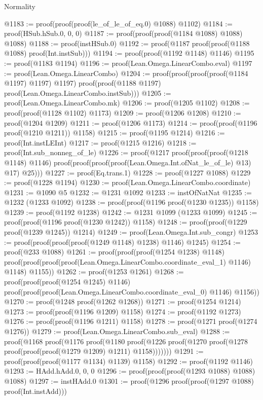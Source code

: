 \begin{lexlean}{Normality}
\begin{coremodule}
@1183 := proof(proof(proof(le_of_le_of_eq.{0}) @1088) @1102)
@1184 := proof(HSub.hSub.{0, 0, 0})
@1187 := proof(proof(proof(@1184 @1088) @1088) @1088)
@1188 := proof(instHSub.{0})
@1192 := proof(@1187 proof(proof(@1188 @1088) proof(Int.instSub)))
@1194 := proof(proof(@1192 @1148) @1146)
@1195 := proof(@1183 @1194)
@1196 := proof(Lean.Omega.LinearCombo.eval)
@1197 := proof(Lean.Omega.LinearCombo)
@1204 := proof(proof(proof(proof(@1184 @1197) @1197) @1197)
      proof(proof(@1188 @1197) proof(Lean.Omega.LinearCombo.instSub)))
@1205 := proof(Lean.Omega.LinearCombo.mk)
@1206 := proof(@1205 @1102)
@1208 := proof(proof(@1128 @1102) @1173)
@1209 := proof(@1206 @1208)
@1210 := proof(@1204 @1209)
@1211 := proof(@1206 @1173)
@1214 := proof(proof(@1196 proof(@1210 @1211)) @1158)
@1215 := proof(@1195 @1214)
@1216 := proof(Int.instLEInt)
@1217 := proof(@1215 @1216)
@1218 := proof(Int.sub_nonneg_of_le)
@1226 := proof(@1217
      proof(proof(proof(@1218 @1148) @1146)
          proof(proof(proof(proof(Lean.Omega.Int.ofNat_le_of_le) @13) @17) @25)))
@1227 := proof(Eq.trans.{1})
@1228 := proof(@1227 @1088)
@1229 := proof(@1228 @1194)
@1230 := proof(Lean.Omega.LinearCombo.coordinate)
@1231 := @1090 @5
@1232 := @1231 @1092
@1233 := instOfNatNat
@1235 := @1232 (@1233 @1092)
@1238 := proof(proof(@1196 proof(@1230 @1235)) @1158)
@1239 := proof(@1192 @1238)
@1242 := @1231 @1099 (@1233 @1099)
@1245 := proof(proof(@1196 proof(@1230 @1242)) @1158)
@1248 := proof(proof(@1229 proof(@1239 @1245)) @1214)
@1249 := proof(Lean.Omega.Int.sub_congr)
@1253 := proof(proof(proof(proof(@1249 @1148) @1238) @1146) @1245)
@1254 := proof(@233 @1088)
@1261 := proof(proof(proof(@1254 @1238) @1148)
      proof(proof(proof(proof(Lean.Omega.LinearCombo.coordinate_eval_1) @1146) @1148) @1155))
@1262 := proof(@1253 @1261)
@1268 := proof(proof(proof(@1254 @1245) @1146)
      proof(proof(proof(Lean.Omega.LinearCombo.coordinate_eval_0) @1146) @1156))
@1270 := proof(@1248 proof(@1262 @1268))
@1271 := proof(@1254 @1214)
@1273 := proof(proof(@1196 @1209) @1158)
@1274 := proof(@1192 @1273)
@1276 := proof(proof(@1196 @1211) @1158)
@1278 := proof(@1271 proof(@1274 @1276))
@1279 := proof(Lean.Omega.LinearCombo.sub_eval)
@1288 := proof(@1168
      proof(@1176
          proof(@1180
              proof(@1226 proof(@1270 proof(@1278 proof(proof(proof(@1279 @1209) @1211) @1158)))))))
@1291 := proof(proof(proof(@1177 @1134) @1139) @1158)
@1292 := proof(@1192 @1146)
@1293 := HAdd.hAdd.{0, 0, 0}
@1296 := proof(proof(proof(@1293 @1088) @1088) @1088)
@1297 := instHAdd.{0}
@1301 := proof(@1296 proof(proof(@1297 @1088) proof(Int.instAdd)))

\end{coremodule}
\end{lexlean}
